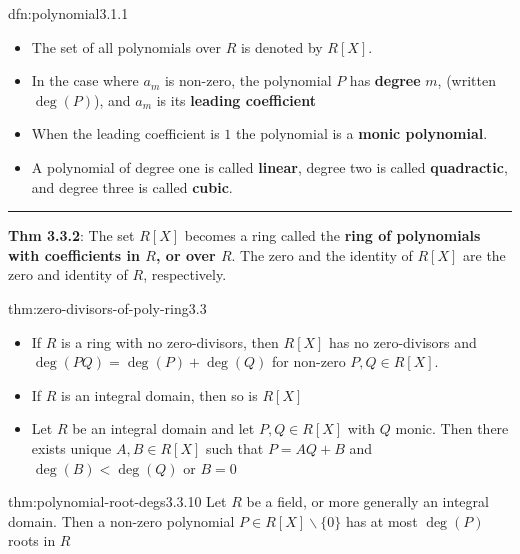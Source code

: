 \documentclass[landscape, 8pt]{extarticle}
\begin{document}
\begin{multicols}{3}
\begin{dfn}[Polynomial]{dfn:polynomial}{3.1.1}
    \vspace{-5pt}
    \begin{itemize}[leftmargin=*]
        \setlength\itemsep{0em}
        \item The set of all polynomials over $R$ is denoted by $R[X]$.
        \item In the case where $a_{m}$ is non-zero, the polynomial $P$ has \textbf{degree} $m$, (written $\deg(P)$), and $a_{m}$ is its \textbf{leading coefficient}
        \item When the leading coefficient is $1$ the polynomial is a \textbf{monic polynomial}.
        \item A polynomial of degree one is called \textbf{linear}, degree two is called \textbf{quadractic}, and degree three is called \textbf{cubic}.
    \end{itemize}

    \vspace{-7pt}
    \noindent\rule{\textwidth}{0.2pt}
    \textbf{Thm 3.3.2}: The set $R[X]$ becomes a ring called the \textbf{ring of polynomials with coefficients in $R$, or over $R$}. The zero and the identity of $R[X]$ are the zero and identity of $R$, respectively.
\end{dfn}

\begin{thm}{thm:zero-divisors-of-poly-ring}{3.3}
    \begin{itemize}
        \setlength\itemsep{0em}
        \item[\textbf{3.3.3}:] If $R$ is a ring with no zero-divisors, then $R[X]$ has no zero-divisors and $\deg(PQ) = \deg(P) + \deg(Q)$ for non-zero $P,Q\in R[X]$.
        \item If $R$ is an integral domain, then so is $R[X]$
        \item[\textbf{3.3.4}:] Let $R$ be an integral domain and let $P, Q\in R[X]$ with $Q$ monic. Then there exists unique $A,B\in R[X]$ such that $P = AQ + B$ and $\deg(B) < \deg(Q)$ or $B = 0$
    \end{itemize}
\end{thm}

\begin{thm}{thm:polynomial-root-degs}{3.3.10}
    Let $R$ be a field, or more generally an integral domain. Then a non-zero polynomial $P\in R[X] \backslash \{0\}$ has at most $\deg(P)$ roots in $R$
\end{thm}







\end{multicols}
\end{document}
